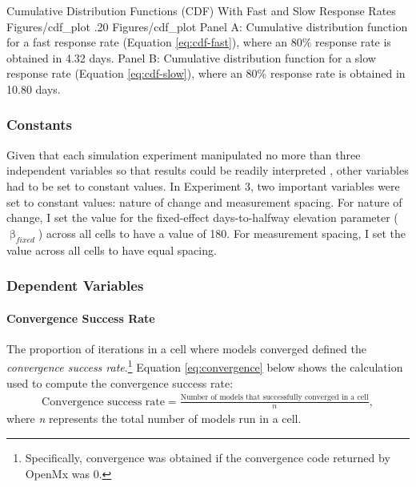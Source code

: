 \documentclass[
12pt, %
twoside,
english]{guelphthesis}
\begin{document}
\begin{apaFigure}
[portrait]
[samepage]
[0cm]
{Cumulative Distribution Functions (CDF) With Fast and Slow Response Rates}
{Figures/cdf_plot}
{.20}
{Figures/cdf_plot}
{Panel A: Cumulative distribution function for a fast response rate (Equation \ref{eq:cdf-fast}), where an 80\% response rate is obtained in 4.32 days. Panel B: Cumulative distribution function for a slow response rate (Equation \ref{eq:cdf-slow}), where an 80\% response rate is obtained in 10.80 days.}
\end{apaFigure}
\hypertarget{constants-1}{%
\subsubsection{Constants}\label{constants-1}}

Given that each simulation experiment manipulated no more than three independent variables so that results could be readily interpreted \autocite{halford2005}, other variables had to be set to constant values. In Experiment 3, two important variables were set to constant values: nature of change and measurement spacing. For nature of change, I set the value for the fixed-effect days-to-halfway elevation parameter (\(\upbeta_{fixed}\)) across all cells to have a value of 180. For measurement spacing, I set the value across all cells to have equal spacing.

\hypertarget{dependent-variables-2}{%
\subsubsection{Dependent Variables}\label{dependent-variables-2}}

\hypertarget{convergence-success-rate-1}{%
\paragraph{Convergence Success Rate}\label{convergence-success-rate-1}}

The proportion of iterations in a cell where models converged defined
the \emph{convergence success rate}.\footnote{Specifically, convergence was obtained if the convergence code returned by OpenMx was 0.} Equation \eqref{eq:convergence} below shows the calculation used to compute the convergence success rate:
\begin{align}
  \text{Convergence success rate} =  \frac{\text{Number of models that successfully converged in a cell}}{n},
  \label{eq:convergence} 
\end{align}
\noindent where \emph{n} represents the total number of models run in a cell.
\end{document}
